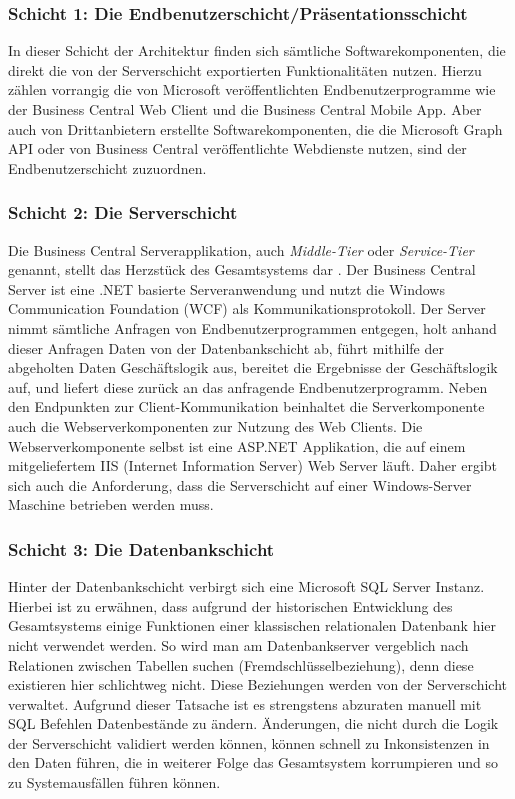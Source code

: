 \pagebreak

\subsubsection{Schicht 1: Die Endbenutzerschicht/Präsentationsschicht }
In dieser Schicht der Architektur finden sich sämtliche Softwarekomponenten, die direkt die von der Serverschicht exportierten Funktionalitäten nutzen. Hierzu zählen vorrangig die von Microsoft veröffentlichten Endbenutzerprogramme wie der Business Central Web Client und die Business Central Mobile App. Aber auch von Drittanbietern erstellte Softwarekomponenten, die die Microsoft Graph API oder von Business Central veröffentlichte Webdienste nutzen, sind der Endbenutzerschicht zuzuordnen.


\subsubsection{Schicht 2: Die Serverschicht }
Die Business Central Serverapplikation, auch \textit{Middle-Tier} oder \textit{Service-Tier} genannt, stellt das Herzstück des Gesamtsystems dar \cite{roys2009implementing}. Der Business Central Server ist eine .NET basierte Serveranwendung und nutzt die Windows Communication Foundation (WCF) als Kommunikationsprotokoll. Der Server nimmt sämtliche Anfragen von Endbenutzerprogrammen entgegen, holt anhand dieser Anfragen Daten von der Datenbankschicht ab, führt mithilfe der abgeholten Daten Geschäftslogik aus, bereitet die Ergebnisse der Geschäftslogik auf, und liefert diese zurück an das anfragende Endbenutzerprogramm. Neben den Endpunkten zur Client-Kommunikation beinhaltet die Serverkomponente auch die Webserverkomponenten zur Nutzung des Web Clients. Die Webserverkomponente selbst ist eine ASP.NET Applikation, die auf einem mitgeliefertem IIS (Internet Information Server) Web Server läuft. Daher ergibt sich auch die Anforderung, dass die Serverschicht auf einer Windows-Server Maschine betrieben werden muss.

\subsubsection{Schicht 3: Die Datenbankschicht}
Hinter der Datenbankschicht verbirgt sich eine Microsoft SQL Server Instanz. Hierbei ist zu erwähnen, dass aufgrund der historischen Entwicklung des Gesamtsystems einige Funktionen einer klassischen relationalen Datenbank hier nicht verwendet werden. So wird man am Datenbankserver vergeblich nach Relationen zwischen Tabellen suchen (Fremdschlüsselbeziehung), denn diese existieren hier schlichtweg nicht. Diese Beziehungen werden von der Serverschicht verwaltet. Aufgrund dieser Tatsache ist es strengstens abzuraten manuell mit SQL Befehlen Datenbestände zu ändern. Änderungen, die nicht durch die Logik der Serverschicht validiert werden können, können schnell zu Inkonsistenzen in den Daten führen, die in weiterer Folge das Gesamtsystem korrumpieren und so zu Systemausfällen führen können.


